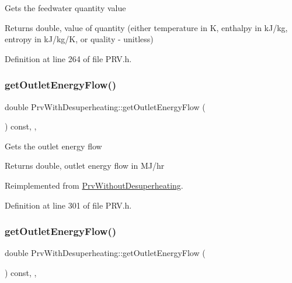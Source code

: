 Gets the feedwater quantity value

\begin{DoxyReturn}{Returns}
double, value of quantity (either temperature in K, enthalpy in k\+J/kg, entropy in k\+J/kg/K, or quality -\/ unitless) 
\end{DoxyReturn}


Definition at line 264 of file P\+R\+V.\+h.

\mbox{\label{class_prv_with_desuperheating_a2394fb62e4fc85252fc4eb15f08e9f1e}} 
\subsubsection{\texorpdfstring{get\+Outlet\+Energy\+Flow()}{getOutletEnergyFlow()}\hspace{0.1cm}{\footnotesize\ttfamily [1/3]}}
{\footnotesize\ttfamily double Prv\+With\+Desuperheating\+::get\+Outlet\+Energy\+Flow (\begin{DoxyParamCaption}{ }\end{DoxyParamCaption}) const\hspace{0.3cm}{\ttfamily [inline]}, {\ttfamily [override]}, {\ttfamily [virtual]}}

Gets the outlet energy flow \begin{DoxyReturn}{Returns}
double, outlet energy flow in M\+J/hr 
\end{DoxyReturn}


Reimplemented from \hyperlink{class_prv_without_desuperheating_a6529a68ffa444ae87c890b2bcbc2cc84}{Prv\+Without\+Desuperheating}.



Definition at line 301 of file P\+R\+V.\+h.

\mbox{\label{class_prv_with_desuperheating_a2394fb62e4fc85252fc4eb15f08e9f1e}} 
\subsubsection{\texorpdfstring{get\+Outlet\+Energy\+Flow()}{getOutletEnergyFlow()}\hspace{0.1cm}{\footnotesize\ttfamily [2/3]}}
{\footnotesize\ttfamily double Prv\+With\+Desuperheating\+::get\+Outlet\+Energy\+Flow (\begin{DoxyParamCaption}{ }\end{DoxyParamCaption}) const\hspace{0.3cm}{\ttfamily [inline]}, {\ttfamily [override]}, {\ttfamily [virtual]}}

